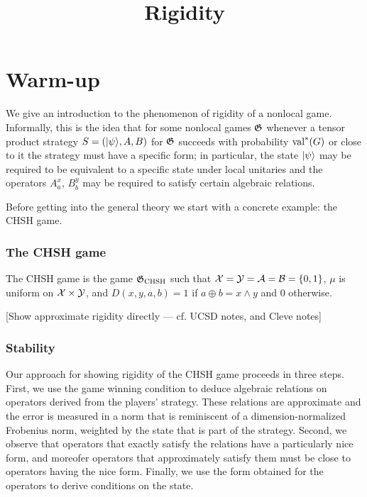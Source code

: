 



\part{Warm-up}
\label{book-part-warmup}

\title{Rigidity}
\label{rigidity}

\maketitle

\label{section-phantom}

\tableofcontents

We give an introduction to the phenomenon of rigidity of a nonlocal game. Informally, this is the idea that for some nonlocal games $\mathfrak{G}$ whenever a tensor product strategy ${S} = (|\psi\rangle,A,B)$ for $\mathfrak{G}$ succeeds with probability $\mathrm{val}^*(G)$ or close to it the strategy must have a specific form; in particular, the state $|\psi\rangle$ may be required to be equivalent to a specific state under local unitaries and the operators $A^x_a$, $B^y_b$ may be required to satisfy certain algebraic relations. 

Before getting into the general theory we start with a concrete example: the CHSH game. 

\section{The CHSH game}
\label{section-chsh}

\begin{definition}
\label{definition-chsh}
The CHSH game is the game $\mathfrak{G}_{\mathrm{CHSH}}$ such that $\mathcal{X} = \mathcal{Y} = \mathcal{A} = \mathcal{B} = \{0,1\}$, $\mu$ is uniform on $\mathcal{X} \times \mathcal{Y}$, and $D(x,y,a,b) = 1$ if $a\oplus b = x\wedge y$ and $0$ otherwise. 
\end{definition}


[Show approximate rigidity directly --- cf. UCSD notes, and Cleve notes]

\section{Stability}
\label{section-stability}

Our approach for showing rigidity of the CHSH game proceeds in three steps. First, we use the game winning condition to deduce algebraic relations on operators derived from the players' strategy. These relations are approximate and the error is measured in a norm that is reminiscent of a dimension-normalized Frobenius norm, weighted by the state that is part of the strategy. Second, we observe that operators that exactly satisfy the relations have a particularly nice form, and moreofer operators that approximately satisfy them must be close to operators having the nice form. Finally, we use the form obtained for the operators to derive conditions on the state. 

